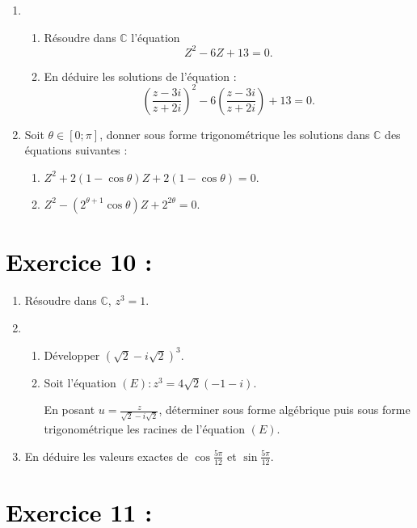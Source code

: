 \documentclass[12pt]{article}
\begin{document}
\begin{enumerate}
    \item
    \begin{enumerate}
        \item Résoudre dans $\mathbb{C}$ l'équation 
        \[
        Z^2 - 6Z + 13 = 0.
        \]

        \item En déduire les solutions de l'équation :
        \[
        \left( \frac{z - 3i}{z + 2i} \right)^2 - 6 \left( \frac{z - 3i}{z + 2i} \right) + 13 = 0.
        \]
    \end{enumerate}

    \item Soit $\theta \in [0; \pi]$, donner sous forme trigonométrique les solutions dans $\mathbb{C}$ des équations suivantes :
    \begin{enumerate}
        \item $Z^2 + 2(1 - \cos \theta)Z + 2(1 - \cos \theta) = 0.$
        \item $Z^2 - (2^{\theta+1} \cos \theta)Z + 2^{2\theta} = 0.$
    \end{enumerate}
\end{enumerate}

\section*{\textcolor{black}{Exercice 10 :}}

\begin{enumerate}
    \item Résoudre dans $\mathbb{C}$, $z^3 = 1$.

    \item
    \begin{enumerate}
        \item Développer $(\sqrt{2} - i\sqrt{2})^3$.

        \item Soit l'équation $(E) : z^3 = 4\sqrt{2}(-1 - i)$.

        En posant $u = \frac{z}{\sqrt{2} - i\sqrt{2}}$, déterminer sous forme algébrique puis sous forme trigonométrique les racines de l'équation $(E)$.
    \end{enumerate}

    \item En déduire les valeurs exactes de $\cos\frac{5\pi}{12}$ et $\sin\frac{5\pi}{12}$.
\end{enumerate}

\section*{\textcolor{black}{Exercice 11 :}}
\end{document}
